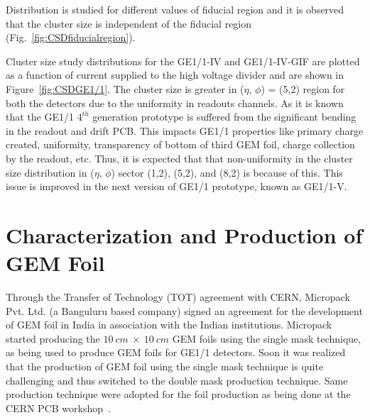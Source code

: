 Distribution is studied for different values of fiducial region and it is observed that the cluster size is independent of the fiducial region (Fig.~\ref{fig:CSDfiducialregion}).

Cluster size study distributions for the GE1/1-IV and GE1/1-IV-GIF are plotted as a function of current supplied to the high voltage divider and are shown in Figure~\ref{fig:CSDGE1/1}.
The cluster size is greater in ($\eta$, $\phi$) = (5,2) region for both the detectors due to the uniformity in readouts channels. As it is known that the GE1/1 $4^{th}$ generation prototype is suffered from the significant bending in the readout and drift PCB. This impacts GE1/1 properties like primary charge created, uniformity, transparency of bottom of third GEM foil, charge collection by the readout, etc. Thus, it is expected that that non-uniformity in the cluster size distribution in ($\eta$, $\phi$) sector (1,2), (5,2), and (8,2) is because of this. This issue is improved in the next version of GE1/1 prototype, known as GE1/1-V.


\section{Characterization and Production of GEM Foil} %
\label{sec:characterization_and_production_of_gem_foil}
Through the Transfer of Technology (TOT) agreement with CERN, Micropack Pvt. Ltd. (a Banguluru based company) signed an agreement for the development of GEM foil in India in association with the Indian institutions.
Micropack started producing the $10~cm~\times~10~cm$ GEM foils using the single mask technique, as  being used to produce GEM foils for GE1/1 detectors.
Soon it was realized that the production of GEM foil using the single mask technique is quite challenging and thus switched to the double mask production technique.
Same production technique were adopted for the foil production as being done at the CERN PCB workshop~\cite{DEOLIVEIRA2009}.

